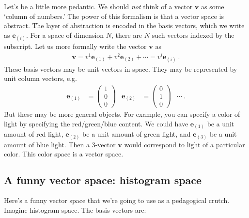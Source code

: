 \documentclass[12pt]{article}
\numberwithin{equation}{section}    %
\renewcommand{\vec}[1]{\mathbf{#1}} %
\begin{document}
Let’s be a little more pedantic. We should \emph{not} think of a vector $\vec{v}$ as some `column of numbers.' The power of this formalism is that a vector space is abstract. The layer of abstraction is encoded in the basis vectors, which we write as $\vec{e}_{(i)}$. For a space of dimension $N$, there are $N$ such vectors indexed by the subscript. Let us more formally write the vector $\vec{v}$ as
\begin{align}
  \vec{v} = 
  v^1 \vec{e}_{(1)}
  +
  v^2 \vec{e}_{(2)} + \cdots
  = v^i \vec{e}_{(i)} \ .
\end{align}
These basis vectors may be unit vectors in space. They may be represented by unit column vectors, e.g.
\begin{align}
  \vec{e}_{(1)}
  &= 
  \begin{pmatrix}
  1 \\ 0 \\ 0
  \end{pmatrix}
  &
    \vec{e}_{(2)}
  &= 
  \begin{pmatrix}
  0 \\ 1 \\ 0
  \end{pmatrix}
  &
  \cdots \ .
\end{align}
But these may be more general objects. For example, you can specify a color of light by specifying the red/green/blue content. We could have $\vec{e}_{(1)}$ be a unit amount of red light, $\vec{e}_{(2)}$ be a unit amount of green light, and $\vec{e}_{(3)}$ be a unit amount of blue light. Then a 3-vector $\vec{v}$ would correspond to light of a particular color. This color space is a vector space.




\subsection{A funny vector space: histogram space}

Here’s a funny vector space that we’re going to use as a pedagogical crutch. Imagine histogram-space. The basis vectors are:
\end{document}
